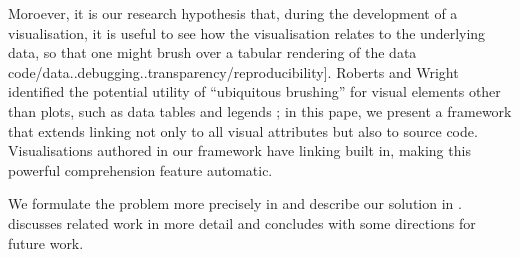 Moroever, it is our research hypothesis that, during the development of a
visualisation, it is useful to see how the visualisation relates to the
underlying data, so that one might brush over a tabular rendering of the data
code/data..debugging..transparency/reproducibility]. Roberts and Wright
identified the potential utility of ``ubiquitous brushing'' for visual elements
other than plots, such as data tables and legends \cite{roberts06}; in this
pape, we present a framework that extends linking not only to all visual
attributes but also to source code. Visualisations authored in our framework
have linking built in, making this powerful comprehension feature automatic.

We formulate the problem more precisely in  and
describe our solution in .  discusses
related work in more detail and  concludes with some
directions for future work.
